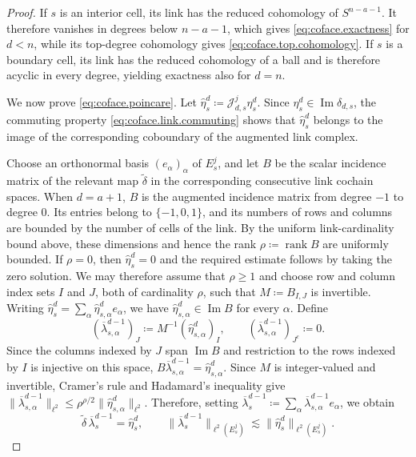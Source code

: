 \documentclass[a4paper,11pt]{article}
\theoremstyle{definition}
\begin{document}
\begin{proof}
If $s$ is an interior cell, its link has the reduced cohomology of $S^{n-a-1}$.
It therefore vanishes in degrees below $n-a-1$, which gives \eqref{eq:coface.exactness} for $d<n$, while its top-degree cohomology gives \eqref{eq:coface.top.cohomology}.
If $s$ is a boundary cell, its link has the reduced cohomology of a ball and is therefore acyclic in every degree, yielding exactness also for $d=n$.

We now prove \eqref{eq:coface.poincare}.
Let $\widehat\eta_s^d\coloneqq\mathcal J_{d,s}^j\eta_s^d$.
Since $\eta_s^d\in\operatorname{Im}\delta_{d,s}$, the commuting property \eqref{eq:coface.link.commuting} shows that $\widehat\eta_s^d$ belongs to the image of the corresponding coboundary of the augmented link complex.

Choose an orthonormal basis $(e_\alpha)_\alpha$ of $E_s^j$, and let $B$ be the scalar incidence matrix of the relevant map $\widetilde\delta$ in the corresponding consecutive link cochain spaces.
When $d=a+1$, $B$ is the augmented incidence matrix from degree $-1$ to degree $0$.
Its entries belong to $\{-1,0,1\}$, and its numbers of rows and columns are bounded by the number of cells of the link.
By the uniform link-cardinality bound above, these dimensions and hence the rank $\rho\coloneqq\operatorname{rank}B$ are uniformly bounded.
If $\rho=0$, then $\widehat\eta_s^d=0$ and the required estimate follows by taking the zero solution.
We may therefore assume that $\rho\geq1$ and choose row and column index sets $I$ and $J$, both of cardinality $\rho$, such that $M\coloneqq B_{I,J}$ is invertible.
Writing $\widehat\eta_s^d=\sum_\alpha\widehat\eta_{s,\alpha}^d e_\alpha$, we have $\widehat\eta_{s,\alpha}^d\in\operatorname{Im}B$ for every $\alpha$.
Define
\[
  \left(\overline\lambda_{s,\alpha}^{d-1}\right)_J
  \coloneqq
  M^{-1}\left(\widehat\eta_{s,\alpha}^d\right)_I,
  \qquad
  \left(\overline\lambda_{s,\alpha}^{d-1}\right)_{J^c}
  \coloneqq
  0.
\]
Since the columns indexed by $J$ span $\operatorname{Im}B$ and restriction to the rows indexed by $I$ is injective on this space, $B\overline\lambda_{s,\alpha}^{d-1}=\widehat\eta_{s,\alpha}^d$.
Since $M$ is integer-valued and invertible, Cramer's rule and Hadamard's inequality give $\|\overline\lambda_{s,\alpha}^{d-1}\|_{\ell^2} \leq\rho^{\rho/2}\|\widehat\eta_{s,\alpha}^d\|_{\ell^2}$.
Therefore, setting $\overline\lambda_s^{d-1}\coloneqq \sum_\alpha\overline\lambda_{s,\alpha}^{d-1}e_\alpha$, we obtain
\begin{equation}\label{eq:link.poincare.application}
  \widetilde\delta\,
  \overline\lambda_s^{d-1}
  =
  \widehat\eta_s^d,
  \qquad
  \|\overline\lambda_s^{d-1}\|_{\ell^2(E_s^j)}
  \lesssim
  \|\widehat\eta_s^d\|_{\ell^2(E_s^j)}.
\end{equation}


\end{proof}
\end{document}
